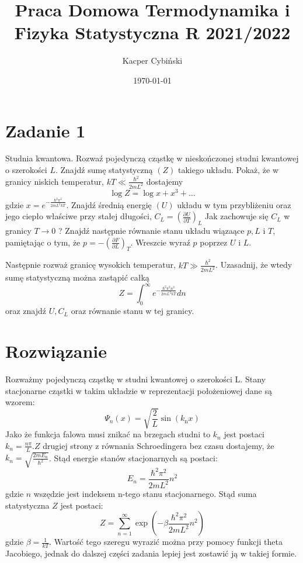 \documentclass[12pt,a4paper]{article}
\title{Praca Domowa Termodynamika i Fizyka Statystyczna R 2021/2022}
\author{Kacper Cybiński}
\date{\today}
\begin{document}
\maketitle

\section{Zadanie 1}

Studnia kwantowa. Rozwaź pojedynczą cząstkę w nieskończonej studni kwantowej o szerokości $L$. Znajdź sumę statystyczną $(Z)$ takiego układu. Pokaż, że w granicy niskich temperatur, $k T \ll \frac{\hbar^{2}}{2 m L^{2}}$ dostajemy
$$
\log Z=\log x+x^{3}+\ldots
$$
gdzie $x=e^{-\frac{\hbar^{2} \pi^{2}}{2 m L^{2} k T}}$. Znajdź średnią energię $(U)$ układu w tym przybliżeniu oraz jego ciepło właściwe przy stałej długości, $C_{L}=\left(\frac{\partial U}{\partial T}\right)_{L}$ Jak zachowuje się $C_{L}$ w granicy $T \rightarrow 0$ ? Znajdź następnie równanie stanu układu wiązaące $p, L$ i $T$, pamiętając o tym, że $p=-\left(\frac{\partial F}{\partial L}\right)_{T}$. Wreszcie wyraź $p$ poprzez $U$ i $L$.

Następnie rozważ granicę wysokich temperatur, $k T \gg \frac{\hbar^{2}}{2 m L^{2}}$. Uzasadnij, że wtedy sumę statystyczną można zastąpić całką
$$
Z=\int_{0}^{\infty} e^{-\frac{\hbar^{2} \pi^{2} n^{2}}{2 m L^{2} k T}} d n
$$
oraz znajdź $U, C_{L}$ oraz równanie stanu w tej granicy.


\section{Rozwiązanie}

Rozważmy pojedynczą cząstkę w studni kwantowej o szerokości L. Stany stacjonarne cząstki w takim układzie w reprezentacji położeniowej dane są wzorem:
$$
\Psi_{n}(x)=\sqrt{\frac{2}{L}} \sin \left(k_{\mathrm{n}} x\right)
$$
Jako że funkcja falowa musi znikać na brzegach studni to $k_{n}$ jest postaci $k_{n}=\frac{n \pi}{L} . Z$ drugiej strony z równania Schroedingera bez czasu dostajemy, że $k_{n}=\sqrt{\frac{2 m E_{n}}{\hbar^{2}}}$. Stąd energie stanów stacjonarnych są postaci:
$$
E_{n}=\frac{\hbar^{2} \pi^{2}}{2 m L^{2}} n^{2}
$$
gdzie $n$ wszędzie jest indeksem n-tego stanu stacjonarnego. Stąd suma statystyczna $Z$ jest postaci:
$$
Z=\sum_{n=1}^{\infty} \exp \left(-\beta \frac{\hbar^{2} \pi^{2}}{2 m L^{2}} n^{2}\right)
$$
gdzie $\beta=\frac{1}{k T}$. Wartość tego szeregu wyrazić można przy pomocy funkcji theta Jacobiego, jednak do dalszej części zadania lepiej jest zostawić ją w takiej formie.
\end{document}
